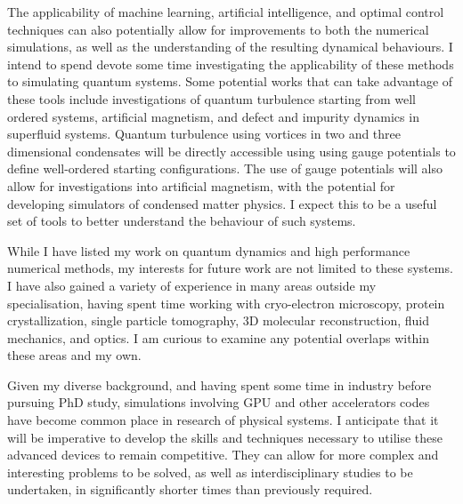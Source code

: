 \documentclass[12pt,a4paper,unicode]{moderncv}
\begin{document}
{    The applicability of machine learning, artificial intelligence, and optimal control techniques can also potentially allow for improvements to both the numerical simulations, as well as the understanding of the resulting dynamical behaviours. I intend to spend devote some time investigating the applicability of these methods to simulating quantum systems. Some potential works that can take advantage of these tools include investigations of quantum turbulence starting from well ordered systems, artificial magnetism, and defect and impurity dynamics in superfluid systems. Quantum turbulence using vortices in two and three dimensional condensates will be directly accessible using using gauge potentials to define well-ordered starting configurations. The use of gauge potentials will also allow for investigations into artificial magnetism, with the potential for developing simulators of condensed matter physics. I expect this to be a useful set of tools to better understand the behaviour of such systems.

    While I have listed my work on quantum dynamics and high performance numerical methods, my interests for future work are not limited to these systems. I have also gained a variety of experience in many areas outside my specialisation, having spent time working with cryo-electron microscopy, protein crystallization, single particle tomography, 3D molecular reconstruction, fluid mechanics, and optics. I am curious to examine any potential overlaps within these areas and my own.

    Given my diverse background, and having spent some time in industry before pursuing PhD study, simulations involving GPU and other accelerators codes have become common place in research of physical systems. I anticipate that it will be imperative to develop the skills and techniques necessary to utilise these advanced devices to remain competitive. They can allow for more complex and interesting problems to be solved, as well as interdisciplinary studies to be undertaken, in significantly shorter times than previously required.


}
\end{document}
